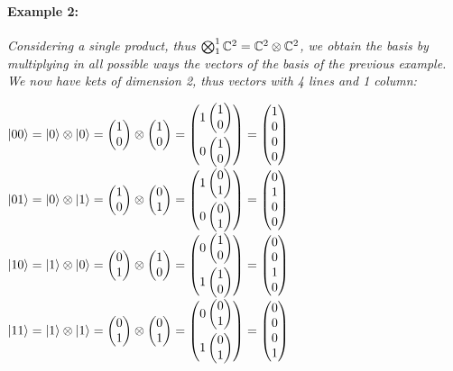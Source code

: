 \documentclass[english]{article}
\newcommand{\sbigotimes}{%
	\mathop{\mathchoice{\textstyle\bigotimes}{\bigotimes}{\bigotimes}{\bigotimes}}%
}
\newcommand{\zeroket}{\begin{pmatrix} 1 \\ 0 \end{pmatrix}}
\newcommand{\oneket}{\begin{pmatrix} 0 \\ 1 \end{pmatrix}}
\begin{document}
			\paragraph{Example 2:} 
			\label{ex:c4}
			\emph{Considering a single product, thus $\sbigotimes_1^{1} \mathbb{C}^{2} = \mathbb{C}^{2} \otimes \mathbb{C}^{2}$, we obtain the basis by multiplying in all possible ways the vectors of the basis of the previous example. We now have kets of dimension 2, thus vectors with 4 lines and 1 column:}
			\begin{center}
					$
					|00\rangle = |0\rangle \otimes |0\rangle = \zeroket \otimes \zeroket = 
					\begin{pmatrix}
					1\zeroket \vspace{3pt} \\
					0\zeroket
					\end{pmatrix} =
					\begin{pmatrix}
					1 \\ 0 \\ 0 \\ 0
					\end{pmatrix}
					$\vfill
					$
					|01\rangle = |0\rangle \otimes |1\rangle = \zeroket \otimes \oneket = 
					\begin{pmatrix}
					1\oneket \vspace{3pt} \\
					0\oneket
					\end{pmatrix} =
					\begin{pmatrix}
					0 \\ 1 \\ 0 \\ 0
					\end{pmatrix}
					$ \vfill
					$
					|10\rangle = |1\rangle \otimes |0\rangle = \oneket \otimes \zeroket = 
					\begin{pmatrix}
					0\zeroket \vspace{3pt} \\
					1\zeroket
					\end{pmatrix} =
					\begin{pmatrix}
					0 \\ 0 \\ 1 \\ 0
					\end{pmatrix}
					$ \vfill
					$
					|11\rangle = |1\rangle \otimes |1\rangle = \oneket \otimes \oneket = 
					\begin{pmatrix}
					0\oneket \vspace{3pt} \\
					1\oneket
					\end{pmatrix} =
					\begin{pmatrix}
					0 \\ 0 \\ 0 \\ 1
					\end{pmatrix}
					$
			\end{center}
		
\end{document}
